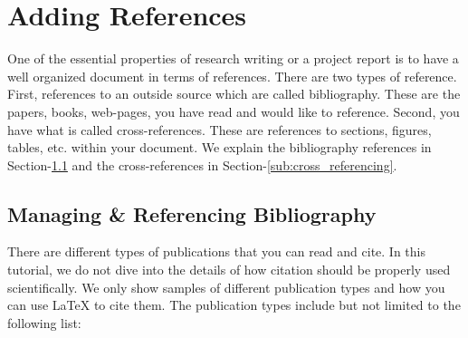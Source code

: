 \section{Adding References}
\label{sec:adding_references}

One of the essential properties of research writing or a project report is to have a well organized document in terms of references. There are two types of reference. First, references to an outside source which are called bibliography. These are the papers, books, web-pages, you have read and would like to reference. Second, you have what is called cross-references. These are references to sections, figures, tables, etc. within your document. We explain the bibliography references in Section-\ref{sub:managing_and_referencing_bibliography} and the cross-references in Section-\ref{sub:cross_referencing}.


\subsection{Managing \& Referencing Bibliography}
\label{sub:managing_and_referencing_bibliography}

There are different types of publications that you can read and cite. In this tutorial, we do not dive into the details of how citation should be properly used scientifically. We only show samples of different publication types and how you can use {\LaTeX} to cite them. The publication types include but not limited to the following list:


